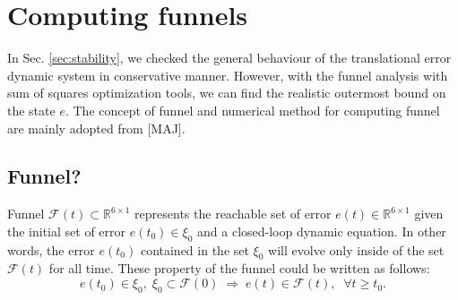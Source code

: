 \documentclass[letterpaper, 10 pt, conference]{ieeeconf}  %
\begin{document}

\section{Computing funnels}
In Sec. \ref{sec:stability}, we checked the general behaviour of the translational error dynamic system in conservative manner.
However, with the funnel analysis with sum of squares optimization tools, we can find the realistic outermost bound on the state $e$.
The concept of funnel and numerical method for computing funnel are mainly adopted from [MAJ]. 
\subsection{Funnel?}
Funnel $\mathcal{F}(t) \subset \mathbb{R}^{6\times 1}$  represents the reachable set of error $e(t)\in \mathbb{R}^{6\times 1}$ given the initial set of error $e(t_0) \in \xi_0$ and a closed-loop dynamic equation.
In other words, the error $e(t_0)$ contained in the set $\xi_0$ will evolve only inside of the set $\mathcal{F}(t)$ for all time.
These property of the funnel could be written as follows:
\begin{equation}
e(t_0) \in \xi_0,\;\xi_0 \subset \mathcal{F}(0)\;\Rightarrow\; e(t) \in \mathcal{F}(t),\;\;\forall t \geq t_0. \label{eq:funnel1}
\end{equation}
\end{document}
